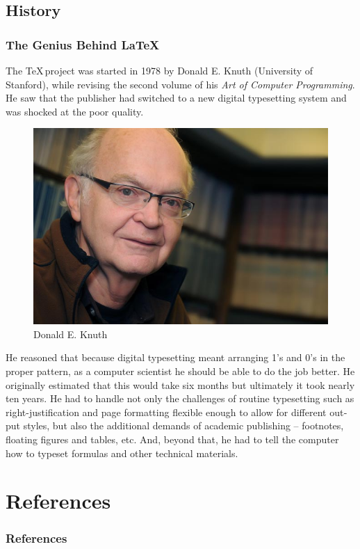 \documentclass[10pt]{beamer}
\begin{document}
\subsection{History}

\begin{frame}\frametitle{The Genius Behind \LaTeX}
\small
The \TeX \,project was started in 1978 by Don­ald E. Knuth (University of Stanford), while re­vis­ing the sec­ond vol­ume of his \textit{Art of Com­puter Pro­gramming}. He saw that the pub­lisher had switched to a new dig­i­tal type­set­ting sys­tem and was shocked at the poor qual­ity.
\begin{figure}
  \vspace{-20pt}
  \begin{center}
    \includegraphics[scale=0.2, keepaspectratio]{./don}
  \end{center}
  \vspace{-20pt}
  \caption{Donald E. Knuth}
  \vspace{-10pt}
\end{figure}
He rea­soned that be­cause dig­i­tal type­set­ting meant ar­rang­ing 1's and 0's in the proper pat­tern, as a com­puter sci­en­tist he should be able to do the job bet­ter. He orig­i­nally es­ti­mated that this would take six months but ul­ti­mately it took nearly ten years. He had to han­dle not only the chal­lenges of rou­tine type­set­ting such as right-jus­ti­fi­ca­tion and page for­mat­ting flex­i­ble enough to al­low for dif­fer­ent out­put styles, but also the ad­di­tional de­mands of aca­demic pub­lish­ing – foot­notes, float­ing fig­ures and ta­bles, etc. And, be­yond that, he had to tell the com­puter how to type­set for­mu­las and other tech­ni­cal ma­te­ri­als.

\end{frame}

\section{References}
\begin{frame}[allowframebreaks]
\frametitle<presentation>{References}    

\nocite{allin}
\nocite{ctan}
\nocite{latexdocs}
\nocite{pinteric}
\nocite{lamport}
\nocite{short}
\nocite{ams}
\nocite{gentle}
\nocite{ams}
\nocite{online}
\nocite{spellcheck}

\end{frame}
\end{document}
